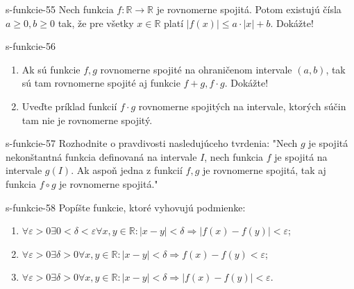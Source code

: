 	\begin{defproblem}{s-funkcie-55}
	Nech funkcia $f: \mathbb{R} \rightarrow \mathbb{R}$ je rovnomerne spojitá. Potom existujú čísla $a \geq 0,b \geq 0$ tak, že pre všetky $x \in \mathbb{R}$ platí $|f(x)| \leq a \cdot |x|+b$. Dokážte!
	\end{defproblem}
	
	\begin{defproblem}{s-funkcie-56}
	\begin{enumerate}
	\item Ak sú funkcie $f,g$ rovnomerne spojité na ohraničenom intervale $(a,b)$, tak sú tam rovnomerne spojité aj funkcie $f+g,f \cdot g$. Dokážte!
	\item Uveďte príklad funkcií $f \cdot g$ rovnomerne spojitých na intervale, ktorých súčin tam nie je rovnomerne spojitý.
	\end{enumerate}
	\end{defproblem}
	
	\begin{defproblem}{s-funkcie-57}
	Rozhodnite o pravdivosti nasledujúceho tvrdenia: "Nech $g$ je spojitá nekonštantná funkcia definovaná na intervale $I$, nech funkcia $f$ je spojitá na intervale $g(I)$. Ak aspoň jedna z funkcií $f,g$ je rovnomerne spojitá, tak aj funkcia $f \circ g$ je rovnomerne spojitá."
	\end{defproblem}
	
	\begin{defproblem}{s-funkcie-58}
	Popíšte funkcie, ktoré vyhovujú podmienke:
	\begin{enumerate}
	\item $\forall \varepsilon >0 \exists 0<\delta<\varepsilon \forall x,y \in \mathbb{R}:|x-y|<\delta \Rightarrow |f(x)-f(y)|<\varepsilon$;
	\item $\forall \varepsilon >0 \exists \delta>0 \forall x,y \in \mathbb{R}:|x-y|<\delta \Rightarrow f(x)-f(y)<\varepsilon$;
	\item $\forall \varepsilon >0 \exists \delta>0 \forall x,y \in \mathbb{R}:|x-y|<\delta \Rightarrow |f(x)-f(y)|<\varepsilon$.
	\end{enumerate}
	\end{defproblem}